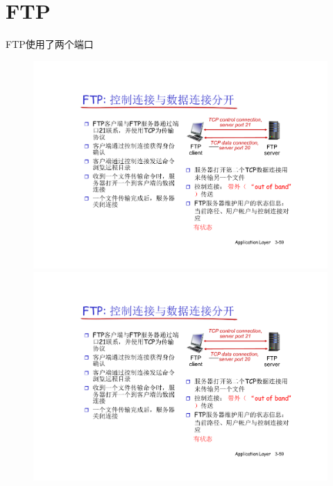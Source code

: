 \documentclass[]{report}
\begin{document}
	\section{FTP}
		FTP使用了两个端口
		\begin{figure}[h!]
			\centering
			\begin{minipage}{20em}
				\centering
				\includegraphics[scale = 0.3]{images/FTP_2_ports_1.pdf}
			\end{minipage}
			\begin{minipage}{20em}
				\centering
				\includegraphics[scale = 0.3]{images/FTP_2_ports_1.pdf}
			\end{minipage}
		\end{figure}
\end{document}
